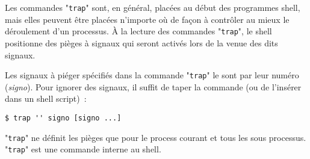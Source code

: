 Les commandes "\texttt{trap}" sont, en g{\'e}n{\'e}ral, plac{\'e}es au d{\'e}but des
programmes shell, mais elles peuvent {\^e}tre plac{\'e}es n'importe o{\`u} de fa\c{c}on
{\`a} contr{\^o}ler au mieux le d{\'e}roulement d'un processus. \`{A} la lecture des
commandes "\texttt{trap}", le shell positionne des pi{\`e}ges {\`a} signaux qui seront
activ{\'e}s lors de la venue des dits signaux.

Les signaux {\`a} pi{\'e}ger sp{\'e}cifi{\'e}s dans la commande "\texttt{trap}" le sont
par leur num{\'e}ro (\textsl{signo}). Pour ignorer des signaux, il suffit de taper la
commande (ou de l'ins{\'e}rer dans un shell script)~:
\begin{center}
\verb*=$ trap '' signo [signo ...]=
\end{center}

"\texttt{trap}" ne d{\'e}finit les pi{\`e}ges que pour le process courant et tous les sous processus.
"\texttt{trap}" est une commande interne au shell.
